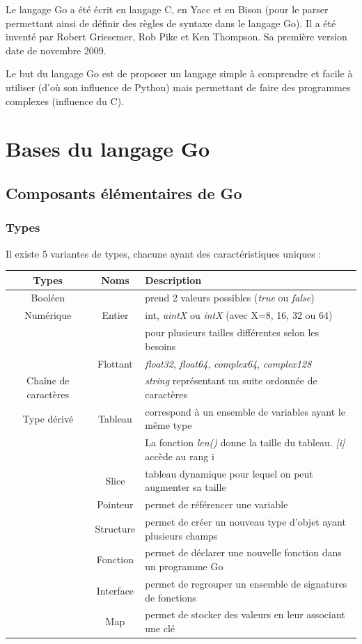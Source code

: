 \documentclass[11pt]{article}
\begin{document}
Le langage Go a été écrit en langage C, en Yacc et en Bison (pour le parser permettant ainsi de définir des règles de syntaxe dans le langage Go). Il a été inventé par Robert Griesemer, Rob Pike et Ken Thompson. Sa première version date de novembre 2009. 

Le but du langage Go est de proposer un langage simple à comprendre et facile à utiliser (d'où son influence de Python) mais permettant de faire des programmes complexes (influence du C). 


\section{Bases du langage Go}

\subsection{Composants élémentaires de Go}

\subsubsection{Types}

Il existe 5 variantes de types, chacune ayant des caractéristiques uniques : 

\begin{tabular}[h]{|c|c|l|}
	\hline
	Types & Noms & Description \\
	\hline
	Booléen & & prend 2 valeurs possibles (\textit{true} ou \textit{false}) \\
	\hline
	Numérique & Entier & int, \textit{uintX} ou \textit{intX} (avec X=8, 16, 32 ou 64) \\
	 & & pour plusieurs tailles différentes selon les besoins \\
	& Flottant &  \textit{float32}, \textit{float64}, \textit{complex64}, \textit{complex128} \\
	\hline 
	Chaîne de caractères & & \textit{string} représentant un suite ordonnée de caractères \\
	\hline
	Type dérivé & Tableau & correspond à un ensemble de variables ayant le même type \\
	 & & La fonction \textit{len()} donne la taille du tableau. \textit{[i]} accède au rang i \\
	 & Slice & tableau dynamique pour lequel on peut augmenter sa taille \\
	 & Pointeur & permet de référencer une variable \\
	 & Structure & permet de créer un nouveau type d'objet ayant plusieurs champs \\
	 & Fonction & permet de déclarer une nouvelle fonction dans un programme Go \\
	 & Interface & permet de regrouper un ensemble de signatures de fonctions \\
	 & Map & permet de stocker des valeurs en leur associant une clé \\
	 \hline 
	
\end{tabular}
\end{document}
